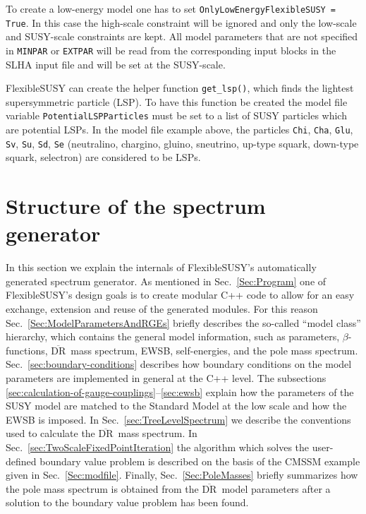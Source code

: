 \documentclass[final,3p,11pt,pdflatex]{elsarticle}
\makeatletter
\newcommand{\fs}{FlexibleSUSY\@\xspace}
\newcommand{\code}[1]{\lstinline|#1|}  %
\newcommand{\textoverline}[1]{$\overline{\mbox{#1}}$}
\newcommand{\DRbar}{\textoverline{DR}\xspace}
\newcommand{\secref}[1]{Sec.~\ref{#1}}
\makeatother
\begin{document}
To create a low-energy model one has to set
\code{OnlyLowEnergyFlexibleSUSY = True}.  In this case the high-scale
constraint will be ignored and only the low-scale and SUSY-scale
constraints are kept.  All model parameters that are not specified in
\code{MINPAR} or \code{EXTPAR} will be read from the corresponding
input blocks in the SLHA input file and will be set at the SUSY-scale.

\fs can create the helper function \code{get_lsp()}, which finds the
lightest supersymmetric particle (LSP).  To have this function be
created the model file variable \code{PotentialLSPParticles} must be
set to a list of SUSY particles which are potential LSPs.  In the
model file example above, the particles \code{Chi}, \code{Cha},
\code{Glu}, \code{Sv}, \code{Su}, \code{Sd}, \code{Se} (neutralino,
chargino, gluino, sneutrino, up-type squark, down-type squark,
selectron) are considered to be LSPs.

\section{Structure of the spectrum generator}
\label{Sec:SpecGenStruct}

In this section we explain the internals of \fs's automatically
generated spectrum generator.
%
As mentioned in \secref{Sec:Program} one of \fs's design goals is to
create modular C++ code to allow for an easy exchange, extension and
reuse of the generated modules.  For this reason
\secref{Sec:ModelParametersAndRGEs} briefly describes the so-called
``model class'' hierarchy, which contains the general model
information, such as parameters, $\beta$-functions, \DRbar\ mass
spectrum, EWSB, self-energies, and the pole mass spectrum.
%
\secref{sec:boundary-conditions} describes how boundary conditions on
the model parameters are implemented in general at the C++ level.  The
subsections \ref{sec:calculation-of-gauge-couplings}--\ref{sec:ewsb}
explain how the parameters of the SUSY model are matched to the
Standard Model at the low scale and how the EWSB is imposed.
%
In \secref{sec:TreeLevelSpectrum} we describe the conventions used to
calculate the \DRbar\ mass spectrum.
%
In \secref{sec:TwoScaleFixedPointIteration} the algorithm which solves
the user-defined boundary value problem is described on the basis of
the CMSSM example given in \secref{Sec:modfile}.
%
Finally, \secref{Sec:PoleMasses} briefly summarizes how the pole mass
spectrum is obtained from the \DRbar\ model parameters after a
solution to the boundary value problem has been found.
\end{document}
